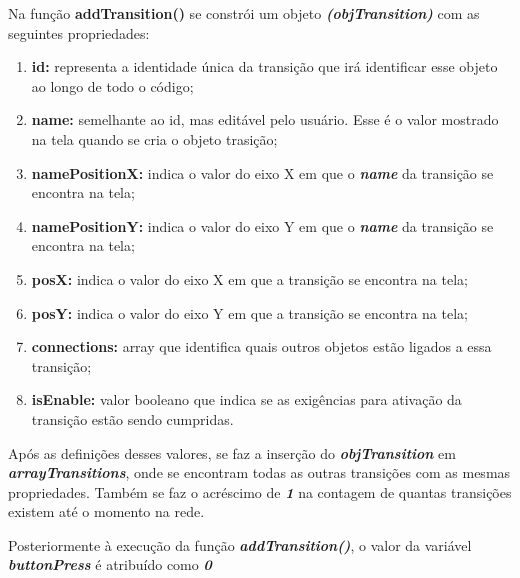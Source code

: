 \documentclass[
	12pt,				%
	openright,			%
	oneside,			%
	a4paper,			%
	english,			%
	brazil				%
	]{abntex2}
\theoremstyle{doispontos}
\begin{document}


Na função \textbf{addTransition()} se constrói um objeto \textbf{\textit{(objTransition)}} com as seguintes propriedades:

\begin{enumerate}
	\item \textbf{id:} representa a identidade única da transição que irá identificar esse objeto ao longo de todo o código;
	\item \textbf{name:} semelhante ao id, mas editável pelo usuário. Esse é o valor mostrado na tela quando se cria o objeto trasição;
	\item \textbf{namePositionX:} indica o valor do eixo X em que o \textbf{\textit{name}} da transição se encontra na tela;
	\item \textbf{namePositionY:} indica o valor do eixo Y em que o \textbf{\textit{name}} da transição se encontra na tela;
	\item \textbf{posX:} indica o valor do eixo X em que a transição se encontra na tela;
	\item \textbf{posY:} indica o valor do eixo Y em que a transição se encontra na tela;
	\item \textbf{connections:} array que identifica quais outros objetos estão ligados a essa transição;
	\item \textbf{isEnable:} valor booleano que indica se as exigências para ativação da transição estão sendo cumpridas.\label{prop:isEnable}
\end{enumerate}

Após as definições desses valores, se faz a inserção do \textbf{\textit{objTransition}} em \textbf{\textit{arrayTransitions}}, onde se encontram todas as outras transições com as mesmas propriedades. Também se faz o acréscimo de \textbf{\textit{1}} na contagem de quantas transições existem até o momento na rede.



Posteriormente à execução da função \textbf{\textit{addTransition()}}, o valor da variável \textbf{\textit{buttonPress}} é atribuído como \textbf{\textit{0}}
\end{document}
